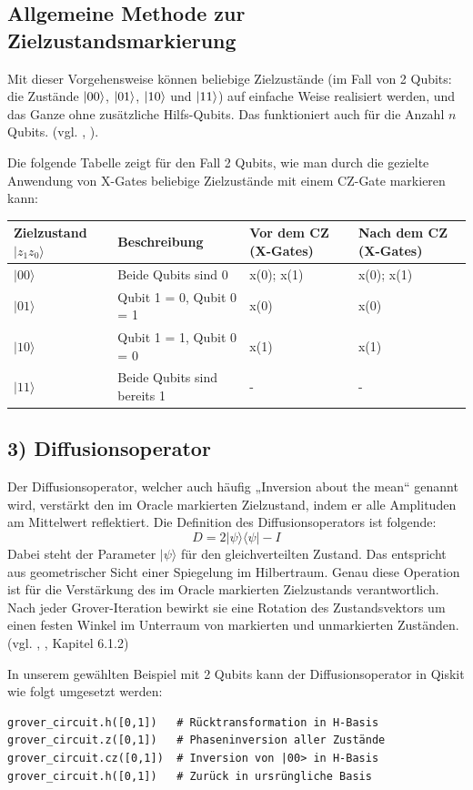 \subsection*{Allgemeine Methode zur Zielzustandsmarkierung}
Mit dieser Vorgehensweise können beliebige Zielzustände (im Fall von 2 Qubits: die Zustände $\ket{00}$, $\ket{01}$, $\ket{10}$ und $\ket{11}$) auf einfache Weise realisiert werden, und das Ganze ohne zusätzliche Hilfs-Qubits. Das funktioniert auch für die Anzahl $n$ Qubits. 
(vgl. \citeauthor{roy_deterministic_2022}, \citeyear{roy_deterministic_2022}). 

Die folgende Tabelle zeigt für den Fall 2  Qubits, wie man durch die gezielte Anwendung von X-Gates beliebige Zielzustände mit einem CZ-Gate markieren kann:

\begin{tabular}{|l|l|l|l|}
\hline
Zielzustand $|z_1 z_0\rangle$ & Beschreibung & Vor dem CZ (X-Gates) & Nach dem CZ (X-Gates) \\
\hline
$|00\rangle$ & Beide Qubits sind 0 & x(0); x(1) & x(0); x(1) \\
\hline
$|01\rangle$ & Qubit 1 = 0, Qubit 0 = 1 & x(0) & x(0) \\
\hline
$|10\rangle$ & Qubit 1 = 1, Qubit 0 = 0 & x(1) & x(1) \\
\hline
$|11\rangle$ & Beide Qubits sind bereits 1 & - & - \\
\hline
\end{tabular}



\subsection*{3) Diffusionsoperator}
Der Diffusionsoperator, welcher auch häufig „Inversion about the mean“ genannt wird, verstärkt den im Oracle markierten Zielzustand, indem er alle Amplituden am Mittelwert reflektiert. Die Definition des Diffusionsoperators ist folgende:
$$
D = 2|\psi\rangle\langle\psi| - I
$$
Dabei steht der Parameter $|\psi\rangle$ für den gleichverteilten Zustand. Das entspricht aus geometrischer Sicht einer Spiegelung im Hilbertraum. Genau diese Operation ist für die Verstärkung des im Oracle markierten Zielzustands verantwortlich. Nach jeder Grover-Iteration bewirkt sie eine Rotation des Zustandsvektors um einen festen Winkel im Unterraum von markierten und unmarkierten Zuständen. (vgl. \citeauthor{nielsen_quantum_2010}, \citeyear{nielsen_quantum_2010}, Kapitel 6.1.2)

In unserem gewählten Beispiel mit 2 Qubits kann der Diffusionsoperator in Qiskit wie folgt umgesetzt werden:
\begin{verbatim}
grover_circuit.h([0,1])   # Rücktransformation in H-Basis
grover_circuit.z([0,1])   # Phaseninversion aller Zustände
grover_circuit.cz([0,1])  # Inversion von |00> in H-Basis
grover_circuit.h([0,1])   # Zurück in ursrüngliche Basis
\end{verbatim}

